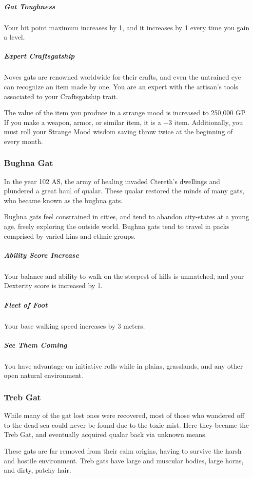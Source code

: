     \subparagraph{Gat Toughness} Your hit point maximum increases by 1, and it increases by 1 every time you gain a level.

    \subparagraph{Expert Craftsgatship} Noves gats are renowned worldwide for their crafts, and even the untrained eye can recognize an item made by one.
    You are an expert with the artisan's tools associated to your Craftsgatship trait.

    The value of the item you produce in a strange mood is increased to 250,000 GP.
    If you make a weapon, armor, or similar item, it is a +3 item.
    Additionally, you must roll your Strange Mood wisdom saving throw twice at the beginning of every month.

\subsubsection{Bughna Gat}
    In the year 102 AS, the army of healing invaded Ctereth's dwellings and plundered a great haul of qualar.
    These qualar restored the minds of many gats, who became known as the bughna gats.

    Bughna gats feel constrained in cities, and tend to abandon city-states at a young age, freely exploring the outside world.
    Bughna gats tend to travel in packs comprised by varied kins and ethnic groups.

    \subparagraph{Ability Score Increase} Your balance and ability to walk on the steepest of hills is unmatched, and your Dexterity score is increased by 1.

    \subparagraph{Fleet of Foot} Your base walking speed increases by 3 meters.

    \subparagraph{See Them Coming} You have advantage on initiative rolls while in plains, grasslands, and any other open natural environment.

\subsubsection{Treb Gat}
    While many of the gat lost ones were recovered, most of those who wandered off to the dead sea could never be found due to the toxic mist.
    Here they became the Treb Gat, and eventually acquired qualar back via unknown means.

    These gats are far removed from their calm origins, having to survive the harsh and hostile environment.
    Treb gats have large and muscular bodies, large horns, and dirty, patchy hair.

